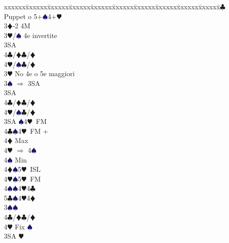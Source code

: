 \documentclass[a4paper,italian]{article}
\newcommand{\BC}{\textcolor{OliveGreen}{$\clubsuit$}}
\newcommand{\BD}{\textcolor{RedOrange}{$\vardiamondsuit$}}
\newcommand{\BH}{\textcolor{Red2}{$\varheartsuit${}}}
\newcommand{\BS}{\textcolor{MidnightBlue}{$\spadesuit${}}}
\newenvironment{bidtable}
{\begin{tabbing}

    xxxxxx\=xxxxxx\=xxxxxx\=xxxxxx\=xxxxxx\=xxxxxx\=xxxxxx\=xxxxxx\=xxxxxx\=xxxxxx\=\kill}
{\end{tabbing} }%
\begin{document}
\begin{multicols}{2}
                                        \begin{bidtable}
                                            3\BC \> Puppet o 5+\BS 4+\BH \+\\
                                            3\BD {}-2 4M\+\\
                                            3\BH/\BS \> 4e invertite\+\\
                                            3SA\+\\
                                            4\BC/\BD {}\BC /\BD \\
                                            4\BH/\BS {}\BC /\BD \-\-\-\\
                                            3\BH \> No 4e o 5e maggiori\+\\
                                            3\BS \> $\Rightarrow$ 3SA\+\\
                                            3SA\+\\
                                            4\BC/\BD {}\BC /\BD \\
                                            4\BH/\BS {}\BC /\BD \-\-\\
                                            3SA \BS 4\BH\ FM\\
                                            4\BC {}\BS 4\BH\ FM +\+\\
                                            4\BD \> Max\+\\
                                            4\BH \> $\Rightarrow$ 4\BS \-\\
                                            4\BS \> Min\-\\
                                            4\BD {}\BS 5\BH\ ISL\\
                                            4\BH {}\BS 5\BH\ FM\\
                                            4\BS {}\BS 4\BH 4\BC \\
                                            5\BC {}\BS 4\BH 4\BD \-\\
                                            3\BS {}\BS \+\\
                                            4\BC/\BD {}\BC /\BD \\
                                            4\BH \> Fix \BS \-\\
                                            3SA \BH \+\\

\end{bidtable}
\end{multicols}
\end{document}
